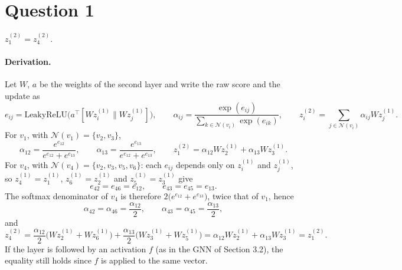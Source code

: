 \documentclass[a4paper]{article}
\begin{document}



\section{Question 1}

$z_1^{(2)} = z_4^{(2)}$.

\paragraph{Derivation.} Let $W$, $a$ be the weights of the second layer and write the raw score and the update as
\begin{equation}
    e_{ij} = \text{LeakyReLU}\big(a^\top [W z_i^{(1)} \| W z_j^{(1)}]\big), \qquad
    \alpha_{ij} = \frac{\exp(e_{ij})}{\sum_{k \in \mathcal{N}(v_i)} \exp(e_{ik})}, \qquad z_i^{(2)} = \sum_{j \in \mathcal{N}(v_i)} \alpha_{ij} W z_j^{(1)} .
\end{equation}
For $v_1$, with $\mathcal{N}(v_1) = \{v_2, v_3\}$,
\begin{equation}
    \alpha_{12} = \frac{e^{e_{12}}}{e^{e_{12}} + e^{e_{13}}}, \qquad
    \alpha_{13} = \frac{e^{e_{13}}}{e^{e_{12}} + e^{e_{13}}}, \qquad
    z_1^{(2)} = \alpha_{12} W z_2^{(1)} + \alpha_{13} W z_3^{(1)} .
\end{equation}
For $v_4$, with $\mathcal{N}(v_4) = \{v_2, v_3, v_5, v_6\}$: each $e_{ij}$ depends only on $z_i^{(1)}$ and $z_j^{(1)}$, so $z_4^{(1)} = z_1^{(1)}$, $z_6^{(1)} = z_2^{(1)}$ and $z_5^{(1)} = z_3^{(1)}$ give
\begin{equation}
    e_{42} = e_{46} = e_{12}, \qquad e_{43} = e_{45} = e_{13} .
\end{equation}
The softmax denominator of $v_4$ is therefore $2\big(e^{e_{12}} + e^{e_{13}}\big)$, twice that of $v_1$, hence
\begin{equation}
    \alpha_{42} = \alpha_{46} = \frac{\alpha_{12}}{2}, \qquad \alpha_{43} = \alpha_{45} = \frac{\alpha_{13}}{2},
\end{equation}
and
\begin{equation}
    z_4^{(2)} = \frac{\alpha_{12}}{2}\big(W z_2^{(1)} + W z_6^{(1)}\big) + \frac{\alpha_{13}}{2}\big(W z_3^{(1)} + W z_5^{(1)}\big)
    = \alpha_{12} W z_2^{(1)} + \alpha_{13} W z_3^{(1)} = z_1^{(2)} .
\end{equation}
If the layer is followed by an activation $f$ (as in the GNN of Section 3.2), the equality still holds since $f$ is applied to the same vector.
\end{document}
